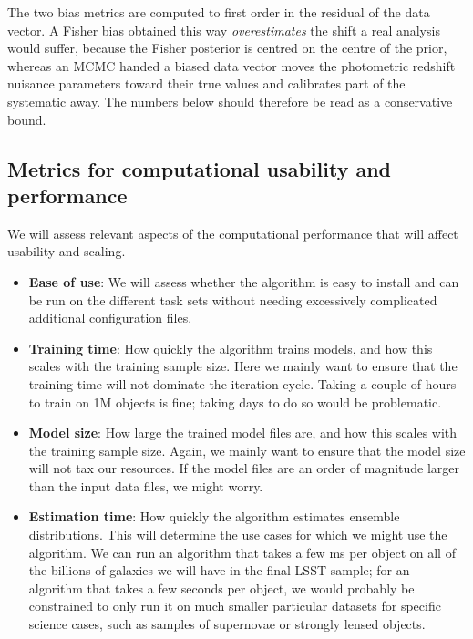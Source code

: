 \documentclass[11pt,twoside,letterpaper,onecolumn,english]{article}
\begin{document}
The two bias metrics are computed to first order in the residual of
the data vector.  A Fisher bias obtained this way \emph{overestimates}
the shift a real analysis would suffer, because the Fisher posterior
is centred on the centre of the prior, whereas an MCMC handed a biased
data vector moves the photometric redshift nuisance parameters toward
their true values and calibrates part of the systematic away.  The
numbers below should therefore be read as a conservative bound.


\subsection{Metrics for computational usability and performance}

We will assess relevant aspects of the computational performance that
will affect usability and scaling. 

\begin{itemize}
\item{\textbf{Ease of use}: We will assess whether the algorithm is easy to
    install and can be run on the different task sets without needing
    excessively complicated additional configuration files.}
\item{\textbf{Training time}: How quickly the algorithm trains models,
    and how this scales with the training sample size. Here we
    mainly want to ensure that the training time will not dominate the
    iteration cycle. Taking a couple of hours to train on 1M objects
    is fine; taking days to do so would be problematic.}
\item{\textbf{Model size}: How large the trained model files are,
    and how this scales with the training sample size. Again, we
    mainly want to ensure that the model size will not tax our resources.
    If the model files are an order of magnitude larger than the input
    data files, we might worry.}
\item{\textbf{Estimation time}: How quickly the algorithm estimates
    ensemble distributions. This will determine the use cases for
    which we might use the algorithm. We can run an algorithm that
    takes a few ms per object on all of the billions of galaxies we
    will have in the final LSST sample; for an algorithm that takes a
    few seconds per object, we would probably be constrained to only
    run it on much smaller particular datasets for specific science
    cases, such as samples of supernovae or strongly lensed objects.}
\end{itemize}
\end{document}
